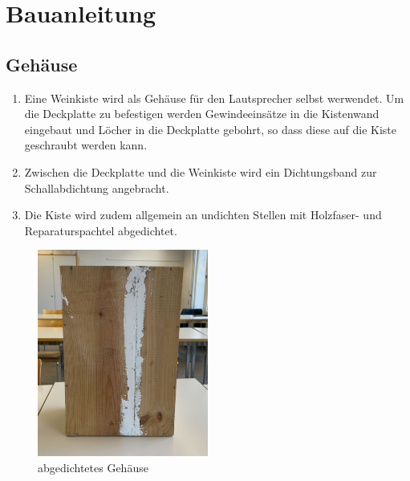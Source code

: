\documentclass[a4paper,11pt]{report}
\begin{document}
\newpage
\section{Bauanleitung}
\subsection{Gehäuse}
\begin{enumerate}
    \item Eine Weinkiste wird als Gehäuse für den Lautsprecher selbst werwendet. Um die Deckplatte zu befestigen werden Gewindeeinsätze in die Kistenwand eingebaut und Löcher in die Deckplatte gebohrt, so dass diese auf die Kiste geschraubt werden kann.
    \item Zwischen die Deckplatte und die Weinkiste wird ein Dichtungsband zur Schallabdichtung angebracht.
    \item Die Kiste wird zudem allgemein an undichten Stellen mit Holzfaser- und Reparaturspachtel abgedichtet. 
\end{enumerate}
\begin{figure}[h]
    \centering
    \includegraphics[width=0.5\textwidth]{resources/images/Fotos/Physik-134.jpg}
    \caption{{abgedichtetes Gehäuse}}
    \label{fig:sealed}
\end{figure}

\newpage
\end{document}
